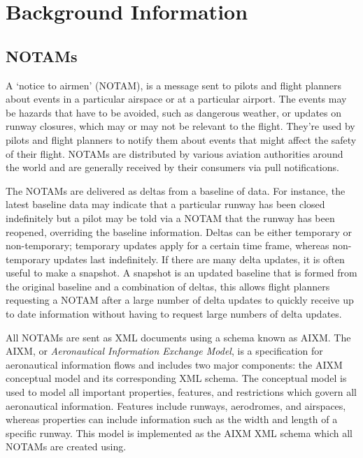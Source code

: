\documentclass[a4paper, 12pt, twoside]{article}
\begin{document}
\section{Background Information}

\subsection{NOTAMs}
\label{sec:bg_notams}
A `notice to airmen' (NOTAM), is a message sent to pilots and flight planners about events in a particular airspace or at a particular airport. The events may be hazards that have to be avoided, such as dangerous weather, or updates on runway closures, which may or may not be relevant to the flight. They're used by pilots and flight planners to notify them about events that might affect the safety of their flight. NOTAMs are distributed by various aviation authorities around the world and are generally received by their consumers via pull notifications.

The NOTAMs are delivered as deltas from a baseline of data. For instance, the latest baseline data may indicate that a particular runway has been closed indefinitely but a pilot may be told via a NOTAM that the runway has been reopened, overriding the baseline information. Deltas can be either temporary or non-temporary; temporary updates apply for a certain time frame, whereas non-temporary updates last indefinitely. If there are many delta updates, it is often useful to make a snapshot. A snapshot is an updated baseline that is formed from the original baseline and a combination of deltas, this allows flight planners requesting a NOTAM after a large number of delta updates to quickly receive up to date information without having to request large numbers of delta updates.

All NOTAMs are sent as XML documents using a schema known as AIXM. The AIXM, or \emph{Aeronautical Information Exchange Model}\cite{aixm}, is a specification for aeronautical information flows and includes two major components: the AIXM conceptual model and its corresponding XML schema. The conceptual model is used to model all important properties, features, and restrictions which govern all aeronautical information. Features include runways, aerodromes, and airspaces, whereas properties can include information such as the width and length of a specific runway. This model is implemented as the AIXM XML schema which all NOTAMs are created using.
\end{document}
